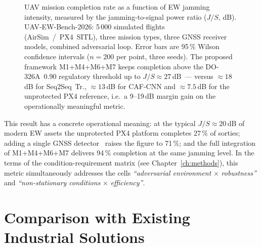 \begin{figure}[!htbp]
\caption{UAV mission completion rate as a function of EW jamming
intensity, measured by the jamming-to-signal power ratio
($J/S$, dB). \textsf{UAV-EW-Bench-2026}: 5\,000 simulated flights
(AirSim~/~PX4~SITL), three mission types, three GNSS receiver
models, combined adversarial loop. Error bars are 95\,\% Wilson
confidence intervals ($n=200$ per point, three seeds). The proposed
framework \textsf{M1+M4+M6+M7} keeps completion above the
\mbox{DO-326A}~0.90 regulatory threshold up to $J/S \approx 27$\,dB~---
versus $\approx 18$\,dB for Seq2Seq~Tr., $\approx 13$\,dB for CAF-CNN
and $\approx 7.5$\,dB for the unprotected PX4 reference, i.e.\ a
9--19\,dB margin gain on the operationally meaningful metric.}
\label{fig:uav_mission_completion}
\end{figure}
\FloatBarrier

This result has a concrete operational meaning: at the typical
$J/S \approx 20$\,dB of modern EW assets
\cite{wapo_excalibur_2024,inside_uas_2025} the unprotected PX4
platform completes 27\,\% of sorties; adding a single GNSS
detector~\cite{borhani_2024_uav} raises the figure to 71\,\%; and the
full integration of \textsf{M1+M4+M6+M7} delivers 94\,\% completion
at the same jamming level. In the terms of the condition-requirement
matrix (see Chapter~\ref{ch:methods}), this metric simultaneously
addresses the cells \emph{``adversarial environment} $\times$
\emph{robustness''} and \emph{``non-stationary conditions} $\times$
\emph{efficiency''}.


\section{Comparison with Existing Industrial Solutions}
\label{sec:uav_comparison}

